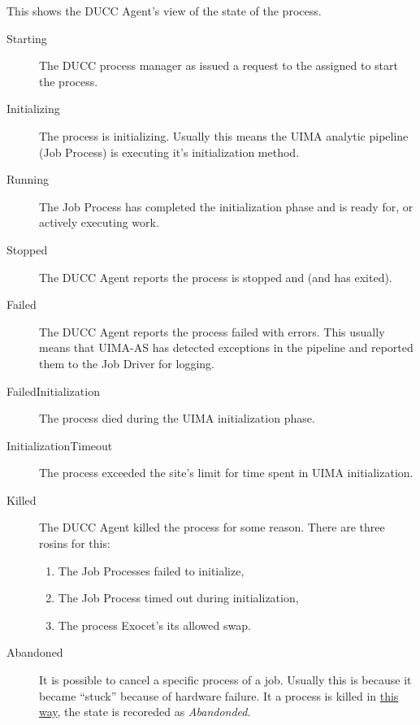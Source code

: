 \begin{description}
            This shows the DUCC Agent's view of the state of the process.
            \begin{description}
               \item[Starting] The DUCC process manager as issued a request to the assigned to
                 start the process.
               \item[Initializing] The process is initializing.  Usually this means the UIMA analytic
                 pipeline (Job Process) is executing it's initialization method.
              \item[Running] The Job Process has completed the initialization phase and is ready for, 
                or actively executing work.
              \item[Stopped] The DUCC Agent reports the process is stopped and (and has exited).
              \item[Failed] The DUCC Agent reports the process failed with errors.  This usually
                means that UIMA-AS has detected exceptions in the pipeline and reported them
                to the Job Driver for logging.
              \item[FailedInitialization] The process died during the UIMA initialization phase.
              \item[InitializationTimeout] The process exceeded the site's limit for time spent
                in UIMA initialization.
              \item[Killed] The DUCC Agent killed the process for some reason.  There are
                three rosins for this:
                \begin{enumerate}
                  \item The Job Processes failed to initialize,
                  \item The Job Process timed out during initialization,
                  \item The process Exocet's its allowed swap.
                \end{enumerate}
              \item[Abandoned] It is possible to cancel a specific process of a job.  Usually
                this is because it became ``stuck'' because of hardware failure.  It a process
                is killed in \hyperref[sec:cli.ducc-cancel]{this way}, the state is recoreded as {\em Abandonded}.
            \end{description}
            

\end{description}
